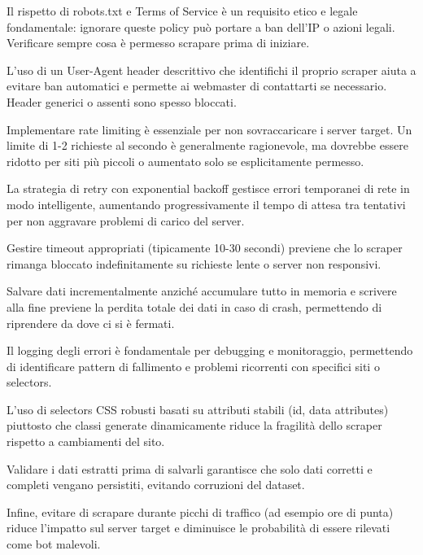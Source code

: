 \begin{tcolorbox}[title=Best Practices]
Il rispetto di robots.txt e Terms of Service è un requisito etico e legale fondamentale: ignorare queste policy può portare a ban dell'IP o azioni legali. Verificare sempre cosa è permesso scrapare prima di iniziare.

L'uso di un User-Agent header descrittivo che identifichi il proprio scraper aiuta a evitare ban automatici e permette ai webmaster di contattarti se necessario. Header generici o assenti sono spesso bloccati.

Implementare rate limiting è essenziale per non sovraccaricare i server target. Un limite di 1-2 richieste al secondo è generalmente ragionevole, ma dovrebbe essere ridotto per siti più piccoli o aumentato solo se esplicitamente permesso.

La strategia di retry con exponential backoff gestisce errori temporanei di rete in modo intelligente, aumentando progressivamente il tempo di attesa tra tentativi per non aggravare problemi di carico del server.

Gestire timeout appropriati (tipicamente 10-30 secondi) previene che lo scraper rimanga bloccato indefinitamente su richieste lente o server non responsivi.

Salvare dati incrementalmente anziché accumulare tutto in memoria e scrivere alla fine previene la perdita totale dei dati in caso di crash, permettendo di riprendere da dove ci si è fermati.

Il logging degli errori è fondamentale per debugging e monitoraggio, permettendo di identificare pattern di fallimento e problemi ricorrenti con specifici siti o selectors.

L'uso di selectors CSS robusti basati su attributi stabili (id, data attributes) piuttosto che classi generate dinamicamente riduce la fragilità dello scraper rispetto a cambiamenti del sito.

Validare i dati estratti prima di salvarli garantisce che solo dati corretti e completi vengano persistiti, evitando corruzioni del dataset.

Infine, evitare di scrapare durante picchi di traffico (ad esempio ore di punta) riduce l'impatto sul server target e diminuisce le probabilità di essere rilevati come bot malevoli.
\end{tcolorbox}

